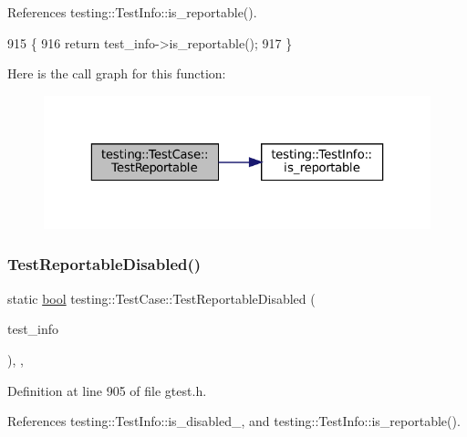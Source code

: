 References testing\+::\+Test\+Info\+::is\+\_\+reportable().


\begin{DoxyCode}
915                                                         \{
916     \textcolor{keywordflow}{return} test\_info->is\_reportable();
917   \}
\end{DoxyCode}
Here is the call graph for this function\+:
\nopagebreak
\begin{figure}[H]
\begin{center}
\leavevmode
\includegraphics[width=323pt]{classtesting_1_1TestCase_a2c3767df71e07939b32f19ef9c6ed271_cgraph}
\end{center}
\end{figure}
\mbox{\label{classtesting_1_1TestCase_a1f2da5337f941d746dfcb98bc4acc149}} 
\subsubsection{\texorpdfstring{Test\+Reportable\+Disabled()}{TestReportableDisabled()}}
{\footnotesize\ttfamily static \hyperlink{classbool}{bool} testing\+::\+Test\+Case\+::\+Test\+Reportable\+Disabled (\begin{DoxyParamCaption}\item[{const \hyperlink{classtesting_1_1TestInfo}{Test\+Info} $\ast$}]{test\+\_\+info }\end{DoxyParamCaption})\hspace{0.3cm}{\ttfamily [inline]}, {\ttfamily [static]}, {\ttfamily [private]}}



Definition at line 905 of file gtest.\+h.



References testing\+::\+Test\+Info\+::is\+\_\+disabled\+\_\+, and testing\+::\+Test\+Info\+::is\+\_\+reportable().


